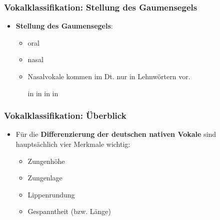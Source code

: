 \begin{frame}
\frametitle{Vokalklassifikation: Stellung des Gaumensegels}

	\begin{itemize}
	
		
		
		\item \textbf{Stellung des Gaumensegels}:
		
		\begin{itemize}
			\item oral
			\item nasal
			
			\item Nasalvokale kommen im Dt. nur in Lehnwörtern vor.

			\eal
			\ex \textipa{[ \~a ]} in 
			\ex \textipa{[ \~E ]} in 
			\ex \textipa{[ \~o ]} in 
			\ex \textipa{[ \~\oe\ ]} in 
			\zl
		
		\end{itemize}
		
	\end{itemize}
	
\end{frame}


\begin{frame}
\frametitle{Vokalklassifikation: Überblick}

	\begin{itemize}
		\item Für die \textbf{Differenzierung der deutschen nativen Vokale} sind hauptsächlich vier Merkmale wichtig:
		
		\begin{itemize}
			
			\item Zungenhöhe
			
			\item Zungenlage
			
			\item Lippenrundung
			
			\item Gespanntheit (bzw. Länge)
		\end{itemize}
		
	\end{itemize}
	
\end{frame}


